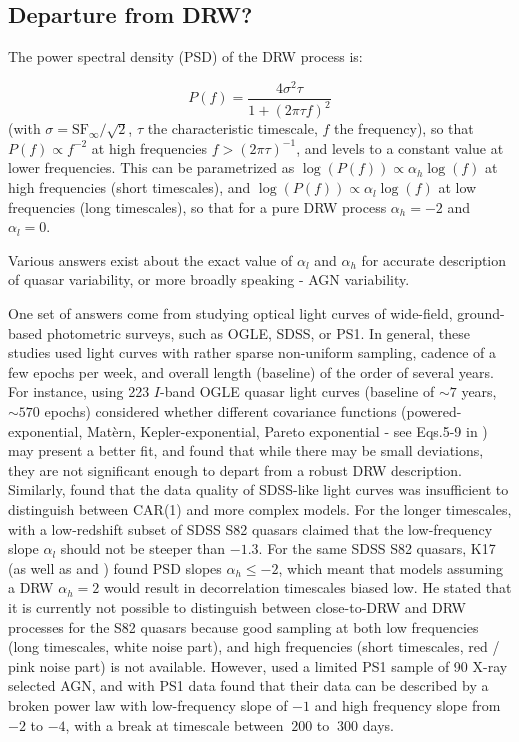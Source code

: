\documentclass[twocolumn]{aastex62}
\begin{document}
\subsection{Departure from DRW?}

The power spectral density (PSD) of the DRW process is:

\begin{equation}
P(f) = \frac{4\sigma^{2}\tau}{1+(2 \pi \tau f)^{2}}
\end{equation}
(with $\sigma = \mathrm{SF}_{\infty} / \sqrt{2}$, $\tau$ the characteristic timescale, $f$ the frequency), so that $P(f) \propto f^{-2}$  at high frequencies $f > (2\pi \tau)^{-1}$, and levels to a constant value at lower frequencies\citep{kelly2014}. This can be parametrized as $\log{(P(f))} \propto \alpha_h \log{(f)}$ at high frequencies (short timescales), and  $\log{(P(f))} \propto \alpha_l \log{(f)}$  at low frequencies (long timescales), so that for a pure DRW process $\alpha_{h}=-2$ and $\alpha_{l} = 0$.  

Various answers exist about the exact value of  $\alpha_{l}$ and $\alpha_{h}$ for accurate description of quasar variability,  or more broadly speaking -  AGN variability. 

One set of answers come from studying optical light curves of wide-field, ground-based photometric surveys, such as OGLE, SDSS, or PS1. In general, these studies used  light curves with rather sparse non-uniform sampling, cadence of a few epochs per week,  and overall length (baseline) of the order of several years.  
For instance, \citet{zu2013}  using 223 $I$-band  OGLE quasar  light curves (baseline of  ${\sim}7$ years, ${\sim}570$ epochs) considered whether different covariance functions (powered-exponential, Mat\`ern, Kepler-exponential, Pareto exponential - see Eqs.5-9 in \citealt{zu2013}) may present a better fit, and found that while there may be small deviations, they are not significant enough to depart from a robust DRW description.  Similarly, \citet{sun2018} found that the data quality of SDSS-like light curves was insufficient to distinguish between CAR(1) and more complex models.   For the longer timescales, \cite{guo2017} with a low-redshift subset of SDSS S82 quasars  claimed  that the low-frequency slope  $\alpha_{l}$ should not be steeper than $-1.3$. For the same SDSS S82 quasars,  K17 (as well as \citealt{kozlowski2016b} and \citealt{caplar2017}) found PSD slopes $\alpha_{h} \leqslant -2$, which meant that models assuming a DRW $\alpha_{h}=2$ would result in decorrelation timescales biased low. He stated that it is currently not possible to distinguish between close-to-DRW and DRW processes for the S82 quasars because good sampling at both low frequencies (long timescales, white noise part), and high frequencies (short timescales, red / pink noise part) is not available. However, \cite{simm2016} used a limited PS1 sample of 90 X-ray selected AGN, and with PS1 data found that their data can be described by a broken power law with low-frequency slope  of $-1$ and high frequency slope from $-2$ to $-4$, with a break at timescale between $~200$ to $~300$ days.   
\end{document}
